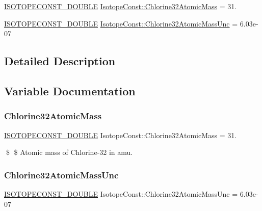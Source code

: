 \begin{DoxyCompactItemize}
\item 
\mbox{\hyperlink{group___isotope_const-_macros_ga8f45a7272ce02c0b4c65c44636ed719a}{I\+S\+O\+T\+O\+P\+E\+C\+O\+N\+S\+T\+\_\+\+D\+O\+U\+B\+LE}} \mbox{\hyperlink{group___isotope_const-_chlorine-_cl32_ga8b089f962e89f3eee50f54fb2e217fa3}{Isotope\+Const\+::\+Chlorine32\+Atomic\+Mass}} = 31.
\item 
\mbox{\hyperlink{group___isotope_const-_macros_ga8f45a7272ce02c0b4c65c44636ed719a}{I\+S\+O\+T\+O\+P\+E\+C\+O\+N\+S\+T\+\_\+\+D\+O\+U\+B\+LE}} \mbox{\hyperlink{group___isotope_const-_chlorine-_cl32_gad19ccf4e99ffc2c890cc2278921cb141}{Isotope\+Const\+::\+Chlorine32\+Atomic\+Mass\+Unc}} = 6.\+03e-\/07
\end{DoxyCompactItemize}


\subsection{Detailed Description}


\subsection{Variable Documentation}
\mbox{\label{group___isotope_const-_chlorine-_cl32_ga8b089f962e89f3eee50f54fb2e217fa3}} 
\subsubsection{\texorpdfstring{Chlorine32\+Atomic\+Mass}{Chlorine32AtomicMass}}
{\footnotesize\ttfamily \mbox{\hyperlink{group___isotope_const-_macros_ga8f45a7272ce02c0b4c65c44636ed719a}{I\+S\+O\+T\+O\+P\+E\+C\+O\+N\+S\+T\+\_\+\+D\+O\+U\+B\+LE}} Isotope\+Const\+::\+Chlorine32\+Atomic\+Mass = 31.}

\$ \$ Atomic mass of Chlorine-\/32 in amu. \mbox{\label{group___isotope_const-_chlorine-_cl32_gad19ccf4e99ffc2c890cc2278921cb141}} 
\subsubsection{\texorpdfstring{Chlorine32\+Atomic\+Mass\+Unc}{Chlorine32AtomicMassUnc}}
{\footnotesize\ttfamily \mbox{\hyperlink{group___isotope_const-_macros_ga8f45a7272ce02c0b4c65c44636ed719a}{I\+S\+O\+T\+O\+P\+E\+C\+O\+N\+S\+T\+\_\+\+D\+O\+U\+B\+LE}} Isotope\+Const\+::\+Chlorine32\+Atomic\+Mass\+Unc = 6.\+03e-\/07}

